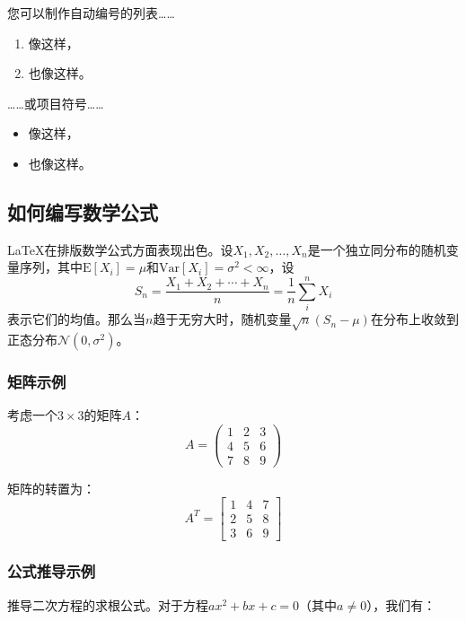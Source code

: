 \documentclass{article}
\begin{document}
您可以制作自动编号的列表……

\begin{enumerate}
    \item 像这样，
    \item 也像这样。
\end{enumerate}
……或项目符号……
\begin{itemize}
    \item 像这样，
    \item 也像这样。
\end{itemize}

\subsection{如何编写数学公式}

\LaTeX{}在排版数学公式方面表现出色。设$X_1, X_2, \ldots, X_n$是一个独立同分布的随机变量序列，其中$\text{E}[X_i] = \mu$和$\text{Var}[X_i] = \sigma^2 < \infty$，设
\[S_n = \frac{X_1 + X_2 + \cdots + X_n}{n}
    = \frac{1}{n}\sum_{i}^{n} X_i\]
表示它们的均值。那么当$n$趋于无穷大时，随机变量$\sqrt{n}(S_n - \mu)$在分布上收敛到正态分布$\mathcal{N}(0, \sigma^2)$。

\subsubsection{矩阵示例}

考虑一个$3 \times 3$的矩阵$A$：
\[A = \begin{pmatrix}
        1 & 2 & 3 \\
        4 & 5 & 6 \\
        7 & 8 & 9
    \end{pmatrix}\]

矩阵的转置为：
\[A^T = \begin{bmatrix}
        1 & 4 & 7 \\
        2 & 5 & 8 \\
        3 & 6 & 9
    \end{bmatrix}\]

\subsubsection{公式推导示例}

推导二次方程的求根公式。对于方程$ax^2 + bx + c = 0$（其中$a \neq 0$），我们有：
\end{document}
